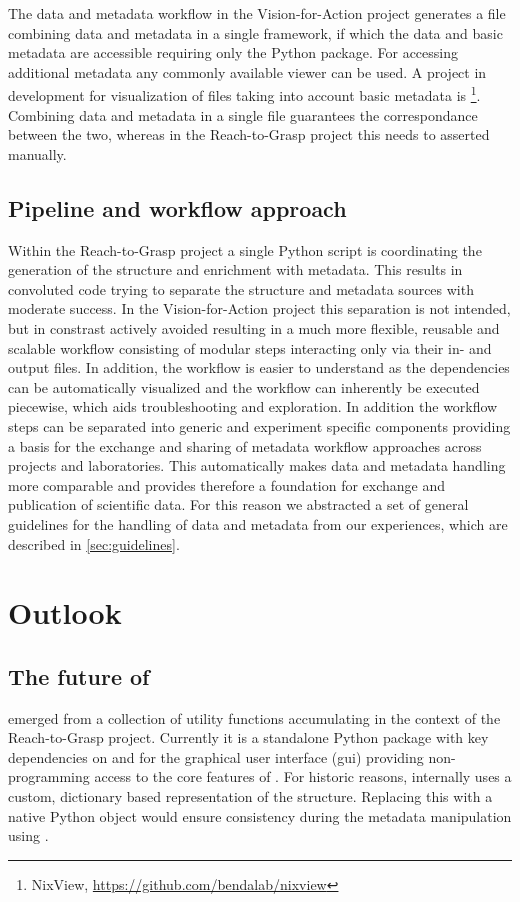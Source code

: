 The data and metadata workflow in the Vision-for-Action project generates a  file combining data and metadata in a single framework, if which the data and basic metadata are accessible requiring only the Python  package. For accessing additional metadata any commonly available  viewer can be used. A project in development for visualization of  files taking into account basic metadata is \footnote{NixView, \url{https://github.com/bendalab/nixview}}. Combining data and metadata in a single file guarantees the correspondance between the two, whereas in the Reach-to-Grasp project this needs to asserted manually.

\subsection{Pipeline and workflow approach}
Within the Reach-to-Grasp project a single Python script is coordinating the generation of the  structure and enrichment with metadata. This results in convoluted code trying to separate the  structure and metadata sources with moderate success. In the Vision-for-Action project this separation is not intended, but in constrast actively avoided resulting in a much more flexible, reusable and scalable workflow consisting of modular steps interacting only via their in- and output files. In addition, the workflow is easier to understand as the dependencies can be automatically visualized and the workflow can inherently be executed piecewise, which aids troubleshooting and exploration. In addition the workflow steps can be separated into generic and experiment specific components providing a basis for the exchange and sharing of metadata workflow approaches across projects and laboratories. This automatically makes data and metadata handling more comparable and provides therefore a foundation for exchange and publication of scientific data. For this reason we abstracted a set of general guidelines for the handling of data and metadata from our experiences, which are described in \cref{sec:guidelines}.

\section{Outlook}

\subsection{The future of }
 emerged from a collection of  utility functions accumulating in the context of the Reach-to-Grasp project. Currently it is a standalone Python package with key dependencies on  and  for the graphical user interface (gui) providing non-programming access to the core features of . For historic reasons,  internally uses a custom, dictionary based representation of the  structure. Replacing this with a native  Python object would ensure consistency during the metadata manipulation using .

